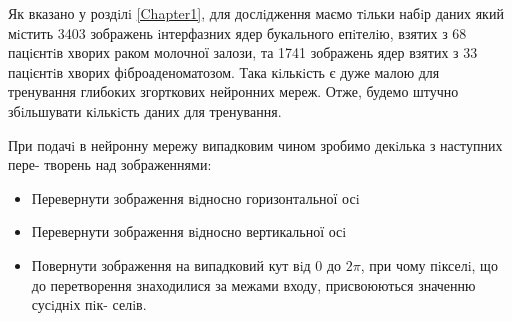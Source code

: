Як вказано у роздiлi \ref{Chapter1}, для дослiдження маємо тiльки набiр даних який мiстить 3403 зображень iнтерфазних ядер букального епiтелiю, взятих з 68 пацiєнтiв хворих раком молочної залози, та 1741 зображень ядер взятих з 33 пацiєнтiв хворих фiброаденоматозом. Така кiлькiсть є дуже малою для тренування глибоких згорткових нейронних мереж. Отже, будемо штучно збiльшувати кiлькiсть даних для тренування.  

При подачi в нейронну мережу випадковим чином зробимо декiлька з наступних пере- творень над зображеннями:
\begin{itemize}
\item Перевернути зображення вiдносно горизонтальної осi
\item Перевернути зображення вiдносно вертикальної осi
\item Повернути зображення на випадковий кут вiд \(0\) до \(2\pi\), при чому пiкселi, що до перетворення знаходилися за межами входу, присвоюються значенню сусiднiх пiк- селiв.
\end{itemize}

